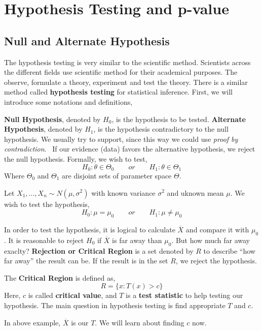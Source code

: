 \chapter{Hypothesis Testing and p-value}
\section{Null and Alternate Hypothesis}
The hypothesis testing is very similar to the scientific method.
Scientists across the different fields use scientific method for their academical purposes.  The observe, formulate a theory, experiment and test the theory. There is a similar method called \textbf{hypothesis testing} for statistical inference. First, we will introduce some notations and definitions,
\begin{definition}
    \textbf{Null Hypothesis}, denoted by $H_0$, is the hypothesis to be tested.\newline
    \textbf{Alternate Hypothesis}, denoted by $H_1$, is the hypothesis contradictory to the null hypothesis. We usually try to support, since this way we could use \textit{proof by contradiction}. \
    If our evidence (data) favors the  alternative hypothesis, we reject the null hypothesis. Formally, we wish to test,
    \[H_0  : \theta  \in \Theta_0 \qquad or \qquad H_1 : \theta \in \Theta_1 \]
    Where $\Theta_0$ and $\Theta_1$ are disjoint sets of parameter space $\Theta$.
\end{definition}
\begin{example}
    Let $X_1,...,X_n \sim N(\mu, \sigma^2)$  with known variance $\sigma^2$ and uknown mean $\mu$. We wish to test the hypothesis,
    \[ H_0: \mu = \mu_0 \qquad or \qquad H_1: \mu  \neq \mu_0 \]
\end{example}
In order to test the hypothesis, it is logical to calculate $\overline{X}$ and compare it with $\mu_0$. It is reasonable to reject $H_0$ if $\overline{X}$ is far away than $\mu_0$. But how much far away exaclty? \newline
\textbf{Rejection or Critical Region} is a set denoted by $R$ to describe ``how far away'' the result can be. If the result is in the set $R$, we reject the hypothesis.
\begin{definition}
    The \textbf{Critical Region} is defined as,
    \[ R = \biggl \{ x : T(x) > c \biggr \} \]
    Here, $c$ is called \textbf{critical value}, and $T$ is a \textbf{test statistic} to help testing our hypothesis.
    The main question in hypothesis testing is find appropriate $T$ and $c$. 
\end{definition}
In above example, $\overline{X}$ is our $T$. We will learn about finding $c$ now.
\newline

